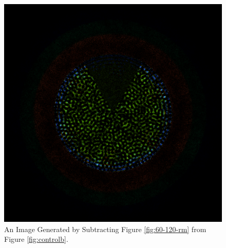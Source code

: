 \begin{figure}[H]
\centering
\includegraphics[width=0.6\linewidth]{figures/60-120/diff-60-120}
\caption{An Image Generated by Subtracting Figure \ref{fig:60-120-rm} from Figure \ref{fig:controlb}.}
\label{fig:60-120-diff}
\end{figure}